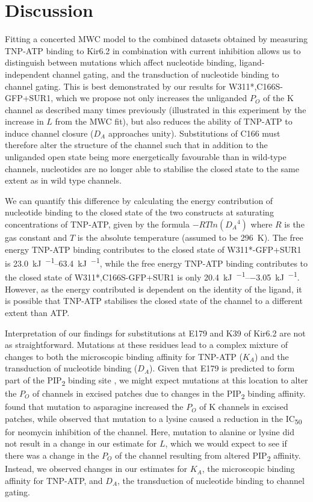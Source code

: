 \section{Discussion}

Fitting a concerted MWC model to the combined datasets obtained by measuring TNP-ATP binding to Kir6.2 in combination with current inhibition allows us to distinguish between mutations which affect nucleotide binding, ligand-independent channel gating, and the transduction of nucleotide binding to channel gating.
This is best demonstrated by our results for W311*,C166S-GFP+SUR1, which we propose not only increases the unliganded $P_O$ of the K\ATP{} channel as described many times previously (illustrated in this experiment by the increase in $L$ from the MWC fit), but also reduces the ability of TNP-ATP to induce channel closure ($D_A$ approaches unity).
Substitutions of C166 must therefore alter the structure of the channel such that in addition to the unliganded open state being more energetically favourable than in wild-type channels, nucleotides are no longer able to stabilise the closed state to the same extent as in wild type channels.

We can quantify this difference by calculating the energy contribution of nucleotide binding to the closed state of the two constructs at saturating concentrations of TNP-ATP, given by the formula $-RTln({D_A}^4)$ where $R$ is the gas constant and $T$ is the absolute temperature (assumed to be \SI{296}{\kelvin}).
The free energy TNP-ATP binding contributes to the closed state of W311*-GFP+SUR1 is \SIrange{23.0}{63.4}{\kilo\joule\per\Molar}, while the free energy TNP-ATP binding contributes to the closed state of W311*,C166S-GFP+SUR1 is only \SIrange{20.4}{-3.05}{\kilo\joule\per\Molar}.
However, as the energy contributed is dependent on the identity of the ligand, it is possible that TNP-ATP stabilises the closed state of the channel to a different extent than ATP.

Interpretation of our findings for substitutions at E179 and K39 of Kir6.2 are not as straightforward.
Mutations at these residues lead to a complex mixture of changes to both the microscopic binding affinity for TNP-ATP ($K_A$) and the transduction of nucleotide binding ($D_A$).
Given that E179 is predicted to form part of the PIP\textsubscript{2} binding site \cite{haider_identification_2007, pipatpolkai_evaluating_2020}, we might expect mutations at this location to alter the $P_O$ of channels in excised patches due to changes in the PIP\textsubscript{2} binding affinity.
\textcite{antcliff_functional_2005} found that mutation to asparagine increased the $P_O$ of K\ATP{} channels in excised patches, while \textcite{pipatpolkai_evaluating_2020} observed that mutation to a lysine caused a reduction in the IC\textsubscript{50} for neomycin inhibition of the channel.
Here, mutation to alanine or lysine did not result in a change in our estimate for $L$, which we would expect to see if there was a change in the $P_O$ of the channel resulting from altered PIP\textsubscript{2} affinity.
Instead, we observed changes in our estimates for $K_A$, the microscopic binding affinity for TNP-ATP, and $D_A$, the transduction of nucleotide binding to channel gating.

